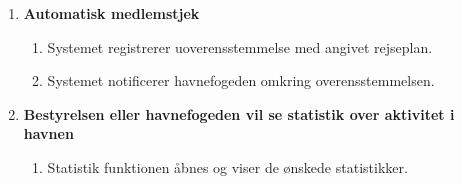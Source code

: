\begin{enumerate}
    \item{\bf{Automatisk medlemstjek}}
      \begin{enumerate}
        \item Systemet registrerer uoverensstemmelse med angivet rejseplan.
        \item Systemet notificerer havnefogeden omkring overensstemmelsen.
      \end{enumerate}

    \item{\bf{Bestyrelsen eller havnefogeden vil se statistik over aktivitet i havnen}}
      \begin{enumerate}
        \item Statistik funktionen åbnes og viser de ønskede statistikker.
      \end{enumerate}

  \end{enumerate}
